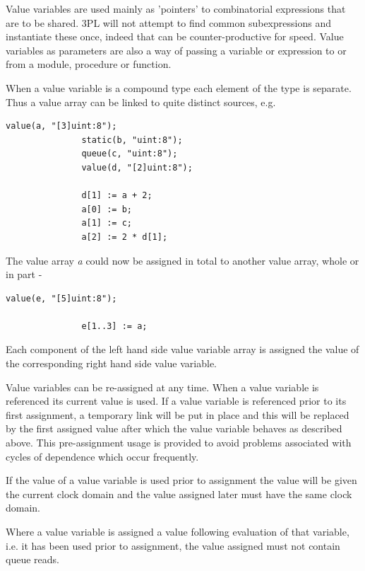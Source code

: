         Value variables are used mainly as 'pointers' to combinatorial
        expressions that are to be shared. 3PL will not attempt to find
        common subexpressions and instantiate these once, indeed that can be
        counter-productive for speed. Value variables as parameters are also
        a way of passing a variable or expression to or from a module,
        procedure or function.
            
        When a value variable is a compound type each element of the
        type is separate. Thus a value array can be linked to
        quite distinct sources, e.g.
        \begin{lstlisting}[gobble=8, language=threepl]
               value(a, "[3]uint:8");
               static(b, "uint:8");
               queue(c, "uint:8");
               value(d, "[2]uint:8");

               d[1] := a + 2;
               a[0] := b;
               a[1] := c;
               a[2] := 2 * d[1];
        \end{lstlisting}
        The value array {\em a} could now be assigned in total to
        another value array, whole or in part -
        \begin{lstlisting}[gobble=8, language=threepl]
               value(e, "[5]uint:8");

               e[1..3] := a;
        \end{lstlisting}
        Each component of the left hand side value variable array is
        assigned the value of the corresponding right hand side value
        variable.
        
        Value variables can be re-assigned at any time. When a value variable
        is referenced its current value is used. If a value variable is
        referenced prior to its first assignment, a temporary link will be put
        in place and this will be replaced by the first assigned value after
        which the value variable behaves as described above. This
        pre-assignment usage is provided to avoid problems associated with
        cycles of dependence which occur frequently.
        
        If the value of a value variable is used prior to assignment the
        value will be given the current clock domain and the value assigned
        later must have the same clock domain.
        
        Where a value variable is assigned a value following evaluation of that
        variable, i.e. it has been used prior to assignment, the value assigned
        must not contain queue reads.
        
